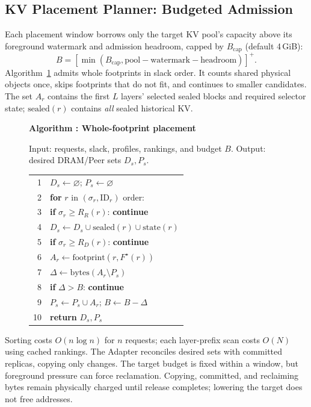 \subsection{KV Placement Planner: Budgeted Admission}
\label{sec:capacity-allocation}

Each placement window borrows only the target KV pool's capacity above
its foreground watermark and admission headroom, capped by
$B_{\mathrm{cap}}$ (default 4\,GiB):
\begin{equation}
 B=[\min(B_{\mathrm{cap}},\mathrm{pool}-\mathrm{watermark}
                         -\mathrm{headroom})]^+.
 \label{eq:peer-budget}
\end{equation}
Algorithm~\ref{alg:placement} admits whole footprints in slack order.
It counts shared physical objects once, skips footprints that do not
fit, and continues to smaller candidates. The set $A_r$ contains the
first $L$ layers' selected sealed blocks and required selector state;
$\mathrm{sealed}(r)$ contains \emph{all} sealed historical KV.

\begin{figure}[t]
  \label{alg:placement}
  \noindent\textbf{Algorithm \thedesignalgorithm: Whole-footprint placement}
  \par\smallskip
  \noindent Input: requests, slack, profiles, rankings, and budget $B$.
  Output: desired DRAM/Peer sets $D_s,P_s$.
  \par\smallskip
  \begin{tabularx}{\columnwidth}{@{}r@{\quad}X@{}}
    \toprule
    1 & $D_s\gets\varnothing$; $P_s\gets\varnothing$ \\
    2 & \textbf{for} $r$ in $(\sigma_r,\mathrm{ID}_r)$ order: \\
    3 & \quad\textbf{if} $\sigma_r\ge R_R(r)$: \textbf{continue} \\
    4 & \quad$D_s\gets D_s\cup\mathrm{sealed}(r)\cup\mathrm{state}(r)$ \\
    5 & \quad\textbf{if} $\sigma_r\ge R_D(r)$: \textbf{continue} \\
    6 & \quad$A_r\gets\mathrm{footprint}(r,F^\star(r))$ \\
    7 & \quad$\Delta\gets\mathrm{bytes}(A_r\setminus P_s)$ \\
    8 & \quad\textbf{if} $\Delta>B$: \textbf{continue} \\
    9 & \quad$P_s\gets P_s\cup A_r$; $B\gets B-\Delta$ \\
   10 & \textbf{return} $D_s,P_s$ \\
    \bottomrule
  \end{tabularx}
\end{figure}

Sorting costs $O(n\log n)$ for $n$ requests; each layer-prefix scan costs
$O(N)$ using cached rankings. The Adapter reconciles desired sets with
committed replicas, copying only changes. The target budget is fixed
within a window, but foreground pressure can force reclamation.
Copying, committed, and reclaiming bytes remain physically charged
until release completes; lowering the target does not free addresses.
